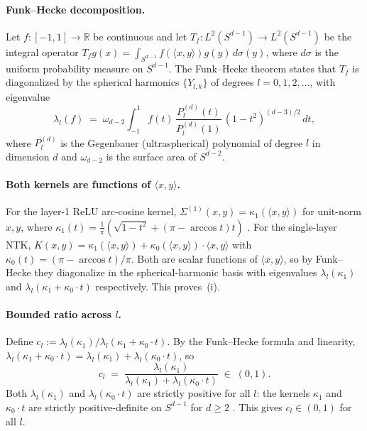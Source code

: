 \documentclass{article}
\newcommand{\R}{\mathbb{R}}
\begin{document}
\paragraph{Funk--Hecke decomposition.}
Let $f \colon [-1, 1] \to \R$ be continuous and let
$T_f \colon L^2(S^{d-1}) \to L^2(S^{d-1})$ be the integral operator
$T_f g(x) = \int_{S^{d-1}} f(\langle x, y\rangle) g(y)\,d\sigma(y)$,
where $d\sigma$ is the uniform probability measure on $S^{d-1}$. The
Funk--Hecke theorem \citep[Theorem 2.22]{atkinson2012spherical} states that
$T_f$ is diagonalized by the spherical harmonics $\{Y_{l,k}\}$
of degrees $l = 0, 1, 2, \ldots$, with eigenvalue
\[
\lambda_l(f)
\;=\; \omega_{d-2} \int_{-1}^1 f(t)\,\frac{P_l^{(d)}(t)}{P_l^{(d)}(1)}\,
(1-t^2)^{(d-3)/2}\,dt,
\]
where $P_l^{(d)}$ is the Gegenbauer (ultraspherical) polynomial of degree
$l$ in dimension $d$ and $\omega_{d-2}$ is the surface area of $S^{d-2}$.

\paragraph{Both kernels are functions of $\langle x, y\rangle$.}
For the layer-1 ReLU arc-cosine kernel,
$\Sigma^{(1)}(x, y) = \kappa_1(\langle x, y\rangle)$ for unit-norm
$x, y$, where $\kappa_1(t) = \tfrac{1}{\pi}(\sqrt{1-t^2} + (\pi - \arccos t) t)$
\citep{cho2009kernel}. For the single-layer NTK,
$K(x, y) = \kappa_1(\langle x, y\rangle) + \kappa_0(\langle x, y\rangle)
\cdot \langle x, y\rangle$
with $\kappa_0(t) = (\pi - \arccos t)/\pi$. Both are scalar functions of
$\langle x, y\rangle$, so by Funk--Hecke they diagonalize in the
spherical-harmonic basis with eigenvalues $\lambda_l(\kappa_1)$ and
$\lambda_l(\kappa_1 + \kappa_0 \cdot t)$ respectively. This proves~(i).

\paragraph{Bounded ratio across $l$.}
Define $c_l := \lambda_l(\kappa_1) / \lambda_l(\kappa_1 + \kappa_0 \cdot t)$.
By the Funk--Hecke formula and linearity,
$\lambda_l(\kappa_1 + \kappa_0 \cdot t)
= \lambda_l(\kappa_1) + \lambda_l(\kappa_0 \cdot t)$, so
\[
c_l \;=\; \frac{\lambda_l(\kappa_1)}{\lambda_l(\kappa_1) + \lambda_l(\kappa_0 \cdot t)}
\;\in\; (0, 1).
\]
Both $\lambda_l(\kappa_1)$ and $\lambda_l(\kappa_0 \cdot t)$ are strictly
positive for all $l$: the kernels $\kappa_1$ and $\kappa_0 \cdot t$ are
strictly positive-definite on $S^{d-1}$ for $d \geq 2$ \citep{bach2017breaking}.
This gives $c_l \in (0, 1)$ for all $l$.
\end{document}

